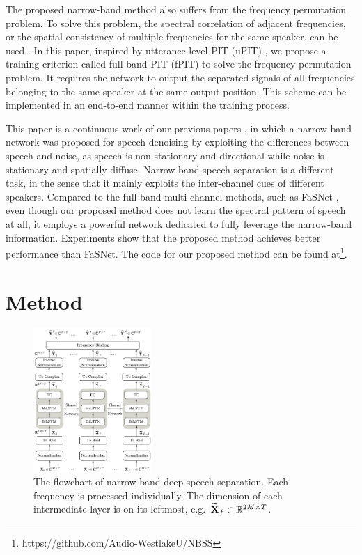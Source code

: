 \documentclass{article}
\begin{document}
The proposed narrow-band method also suffers from the frequency permutation problem.
To solve this problem, the spectral correlation of adjacent frequencies, or the spatial consistency of multiple frequencies for the same speaker, can be used \cite{sawada_robust_2004, mazur_approach_2009}.
In this paper, inspired by utterance-level PIT (uPIT) \cite{kolbaek_multitalker_2017}, we propose a training criterion called full-band PIT (fPIT) to solve the frequency permutation problem.
It requires the network to output the separated signals of all frequencies belonging to the same speaker at the same output position.
This scheme can be implemented in an end-to-end manner within the training process.

This paper is a continuous work of our previous papers \cite{li_multichannel_2019, li_narrow-band_2019}, in which a narrow-band network was proposed for speech denoising by exploiting the differences between speech and noise, as speech is non-stationary and directional while noise is stationary and spatially diffuse.
Narrow-band speech separation is a different task, in the sense that it mainly exploits the inter-channel cues of different speakers.
Compared to the full-band multi-channel methods, such as FaSNet \cite{luo_fasnet_2019, luo_end--end_2020}, even though our proposed method does not learn the spectral pattern of speech at all, it employs a powerful network dedicated to fully leverage the narrow-band information.
Experiments show that the proposed method achieves better performance than FaSNet.
The code for our proposed method can be found at\footnote{https://github.com/Audio-WestlakeU/NBSS}.


\section{Method}
\label{sec:method}

\begin{figure}[tb]
  \centering
  \includegraphics[width=0.4\textwidth]{workflow-v5.pdf}
  \vspace*{-3mm}
  \caption{The flowchart of narrow-band deep speech separation. Each frequency is processed individually. The dimension of each intermediate layer is on its leftmost, e.g.\ $\boldsymbol{\widetilde{\rm X}}_{f}\in  \mathbb{R}^{2M\times T}$.}
  \label{fig1}
\end{figure}
\end{document}
